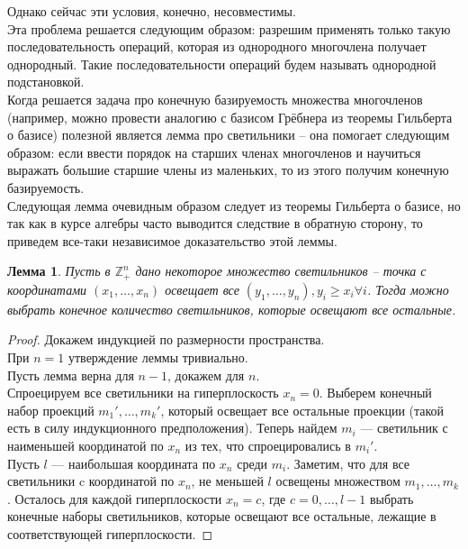 \documentclass[12pt,a4paper]{article}
\newtheorem{lemma}{Лемма}[section]
\begin{document}
    Однако сейчас эти условия, конечно, несовместимы.\\
    Эта проблема решается следующим образом: разрешим применять только такую последовательность операций, которая из однородного многочлена получает однородный.
    Такие последовательности операций будем называть однородной подстановкой.\\
    Когда решается задача про конечную базируемость множества многочленов (например, можно провести аналогию с базисом Грёбнера из теоремы Гильберта о базисе) полезной является лемма про светильники -- она помогает следующим образом: если ввести порядок на старших членах многочленов и научиться выражать большие старшие члены из маленьких, то из этого получим конечную базируемость.\\
    Следующая лемма очевидным образом следует из теоремы Гильберта о базисе, но так как в курсе алгебры часто выводится следствие в обратную сторону, то приведем все-таки независимое доказательство этой леммы.\vskip 0.1in\noindent
    \begin{lemma}
        \label{lamp}
        Пусть в $\mathbb{Z}_+^n$ дано некоторое множество светильников -- точка с координатами $(x_1,\ldots,x_n)$ освещает все $(y_1,\ldots,y_n), y_i\geq x_i \forall i$. Тогда можно выбрать конечное количество светильников, которые освещают все остальные.
    \end{lemma}
    \begin{proof}
        Докажем индукцией по размерности пространства.\\
        При $n=1$ утверждение леммы тривиально.\\
        Пусть лемма верна для $n-1$, докажем для $n$. \\
        Спроецируем все светильники на гиперплоскость $x_n=0$. Выберем конечный набор проекций $m_1',\ldots,m_k'$, который освещает все остальные проекции (такой есть в силу индукционного предположения). Теперь найдем $m_i$ --- светильник с наименьшей координатой по $x_n$ из тех, что спроецировались в $m_i'$.\\
        Пусть $l$ --- наибольшая координата по $x_n$ среди $m_i$. Заметим, что для все светильники c координатой по $x_n$, не меньшей $l$ освещены множеством $m_1,\ldots,m_k$. Осталось для каждой гиперплоскости $x_n=c$, где $c=0,\ldots,l-1$ выбрать конечные наборы светильников, которые освещают все остальные, лежащие в соответствующей гиперплоскости.
    \end{proof}
\end{document}
